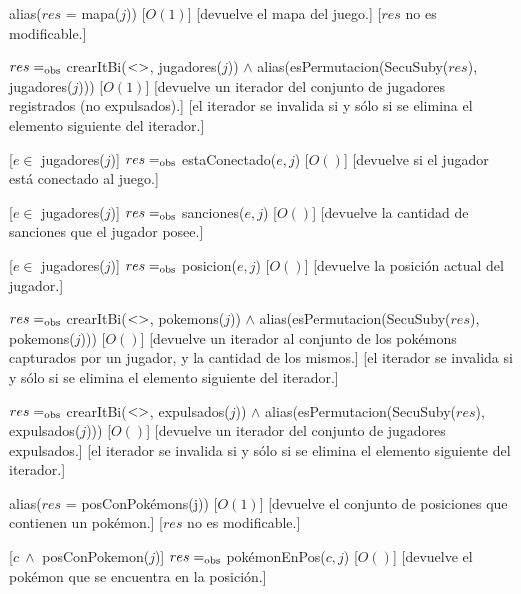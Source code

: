 \begin{Interfaz}
	{alias($res$ = mapa($j$))}
	[$O(1)$]
	[devuelve el mapa del juego.]
	[$res$ no es modificable.]

	{$res =_{\mathrm{obs}}$ crearItBi($<>$, jugadores($j$)) $\land$ alias(esPermutacion(SecuSuby($res$), jugadores($j$)))}
	[$O(1)$]
	[devuelve un iterador del conjunto de jugadores registrados (no expulsados).]
	[el iterador se invalida si y sólo si se elimina el elemento siguiente del iterador.]

	[$e \in$ jugadores($j$)]
	{$res =_{\mathrm{obs}}$ estaConectado($e, j$)}
	[$O()$]
	[devuelve si el jugador está conectado al juego.]

	[$e \in$ jugadores($j$)]
	{$res =_{\mathrm{obs}}$ sanciones($e, j$)}
	[$O()$]
	[devuelve la cantidad de sanciones que el jugador posee.]

	[$e \in$ jugadores($j$)]
	{$res =_{\mathrm{obs}}$ posicion($e, j$)}
	[$O()$]
	[devuelve la posición actual del jugador.]

	{$res =_{\mathrm{obs}}$ crearItBi($<>$, pokemons($j$)) $\land$ alias(esPermutacion(SecuSuby($res$), pokemons($j$)))}
	[$O()$]
	[devuelve un iterador al conjunto de los pokémons capturados por un jugador, y la cantidad de los mismos.]
	[el iterador se invalida si y sólo si se elimina el elemento siguiente del iterador.]

	{$res =_{\mathrm{obs}}$ crearItBi($<>$, expulsados($j$)) $\land$ alias(esPermutacion(SecuSuby($res$), expulsados($j$)))}
	[$O()$]
	[devuelve un iterador del conjunto de jugadores expulsados.]
	[el iterador se invalida si y sólo si se elimina el elemento siguiente del iterador.]

	{alias($res$ = posConPokémons(j))}
	[$O(1)$]
	[devuelve el conjunto de posiciones que contienen un pokémon.]
	[$res$ no es modificable.]

	[$c \ \land$ posConPokemon($j$)]
	{$res =_{\mathrm{obs}}$ pokémonEnPos($c,j$)}
	[$O()$]
	[devuelve el pokémon que se encuentra en la posición.]


\end{Interfaz}

